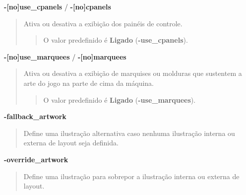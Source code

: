 \documentclass[letterpaper,10pt,brazil]{sphinxmanual}
\begin{document}
\label{commandline/commandline-all:mame-commandline-nousecpanels}
\textbf{-{[}no{]}use\_cpanels} / \textbf{-{[}no{]}cpanels}
\begin{quote}

Ativa ou desativa a exibição dos painéis de controle.
\begin{quote}

O valor predefinido é \textbf{Ligado} (\textbf{-use\_cpanels}).
\end{quote}
\end{quote}
\label{commandline/commandline-all:mame-commandline-nousemarquees}
\textbf{-{[}no{]}use\_marquees} / \textbf{-{[}no{]}marquees}
\begin{quote}

Ativa ou desativa a exibição de marquises ou molduras que sustentem
a arte do jogo na parte de cima da máquina.
\begin{quote}

O valor predefinido é \textbf{Ligado} (\textbf{-use\_marquees}).
\end{quote}
\end{quote}
\label{commandline/commandline-all:mame-commandline-fallbackartwork}
\textbf{-fallback\_artwork}
\begin{quote}

Define uma ilustração alternativa caso nenhuma ilustração interna ou
externa de layout seja definida.
\end{quote}
\label{commandline/commandline-all:mame-commandline-overrideartwork}
\textbf{-override\_artwork}
\begin{quote}

Define uma ilustração para sobrepor a ilustração interna ou externa
de layout.
\end{quote}
\end{document}
